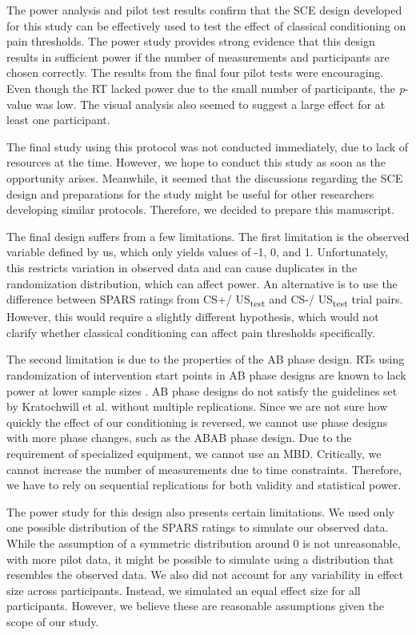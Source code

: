 \documentclass{article}
\begin{document}
The power analysis and pilot test results confirm that the SCE design developed for this study can be effectively used to test the effect of classical conditioning on pain thresholds. The power study provides strong evidence that this design results in sufficient power if the number of measurements and participants are chosen correctly. The results from the final four pilot tests were encouraging. Even though the RT lacked power due to the small number of participants, the \emph{p}-value was low. The visual analysis also seemed to suggest a large effect for at least one participant. 

The final study using this protocol was not conducted immediately, due to lack of resources at the time. However, we hope to conduct this study as soon as the opportunity arises. Meanwhile, it seemed that the discussions regarding the SCE design and preparations for the study might be useful for other researchers developing similar protocols. Therefore, we decided to prepare this manuscript.

The final design suffers from a few limitations. The first limitation is the observed variable defined by us, which only yields values of -1, 0, and 1. Unfortunately, this restricts variation in observed data and can cause duplicates in the randomization distribution, which can affect power. An alternative is to use the difference between SPARS ratings from CS+/ US\textsubscript{test} and CS-/ US\textsubscript{test} trial pairs. However, this would require a slightly different hypothesis, which would not clarify whether classical conditioning can affect pain thresholds specifically.

The second limitation is due to the properties of the AB phase design. RTs using randomization of intervention start points in AB phase designs are known to lack power at lower sample sizes \parencite{Michiels2019}. AB phase designs do not satisfy the guidelines set by Kratochwill et al. \parencite{Kratochwill2010} without multiple replications. Since we are not sure how quickly the effect of our conditioning is reversed, we cannot use phase designs with more phase changes, such as the ABAB phase design. Due to the requirement of specialized equipment, we cannot use an MBD. Critically, we cannot increase the number of measurements due to time constraints. Therefore, we have to rely on sequential replications for both validity and statistical power. 

The power study for this design also presents certain limitations. We used only one possible distribution of the SPARS ratings to simulate our observed data. While the assumption of a symmetric distribution around 0 is not unreasonable, with more pilot data, it might be possible to simulate using a distribution that resembles the observed data. We also did not account for any variability in effect size across participants. Instead, we simulated an equal effect size for all participants. However, we believe these are reasonable assumptions given the scope of our study. 
\end{document}
